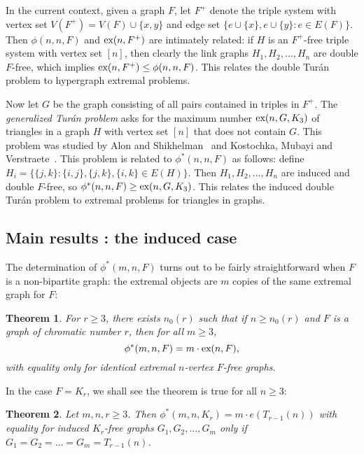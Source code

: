 \documentclass[12pt]{article}
\newtheorem{theorem}{Theorem}
\newcommand*{\ex}{\textnormal{ex}}
\begin{document}
In the current context, given a graph $F$, let $F^+$ denote the triple system with vertex set $V(F^+) = V(F) \cup \{x,y\}$ and edge set $\{e \cup \{x\},e \cup \{y\} : e \in E(F)\}$. Then $\phi(n,n,F)$ and $\ex(n,F^+)$ are intimately related: if $H$ is an $F^+$-free triple system with vertex set $[n]$, then clearly the link graphs $H_1,H_2,\dots,H_n$ are double $F$-free, which implies $\ex(n,F^+) \leq \phi(n,n,F)$. This relates the double Tur\'{a}n problem to hypergraph extremal problems.

Now let $G$ be the graph consisting of all pairs contained in triples in $F^+$. The \textit{generalized Tur\'{a}n problem} asks for the maximum number $\ex(n,G,K_3)$ of triangles in a graph $H$ with vertex set $[n]$ that does not contain $G$. This problem was studied by Alon and Shikhelman~\cite{AlonShikhelman2016} and Kostochka, Mubayi and Verstraete~\cite{KostochkaMubayiV2015,MubayiMukherjee2023,MubayiV2016}. This problem is related to $\phi^*(n,n,F)$ as follows: define $H_i = \{\{j,k\} : \{i,j\},\{j,k\},\{i,k\} \in E(H)\}$. Then $H_1,H_2,\dots,H_n$ are induced and double $F$-free, so $\phi^*(n,n,F) \geq \ex(n,G,K_3)$. This relates the induced double Tur\'{a}n problem to extremal problems for triangles in graphs.

\subsection{Main results : the induced case}

The determination of $\phi^*(m,n,F)$ turns out to be fairly straightforward when $F$ is a non-bipartite graph: the extremal objects are $m$ copies of the same extremal graph for $F$:

\begin{theorem}\label{thm:inducedF}
For $r \geq 3$, there exists $n_0(r)$ such that if $n \geq n_0(r)$ and $F$ is a graph of chromatic number $r$, then for all $m \geq 3$,    
  \[
    \phi^*(m, n, F) = m \cdot \ex(n, F),
  \]
  with equality only for identical extremal $n$-vertex $F$-free graphs.
\end{theorem}

In the case $F = K_r$, we shall see the theorem is true for all $n \geq 3$:

\begin{theorem}\label{thm:complete}
Let $m, n, r \geq 3$. Then $\phi^*(m,n,K_{r}) = m \cdot e(T_{r - 1}(n))$ with equality for induced $K_{r}$-free graphs $G_1, G_2, \dots, G_m$ only if $G_1 = G_2 = \dots = G_m = T_{r - 1}(n)$.  
\end{theorem}
\end{document}
